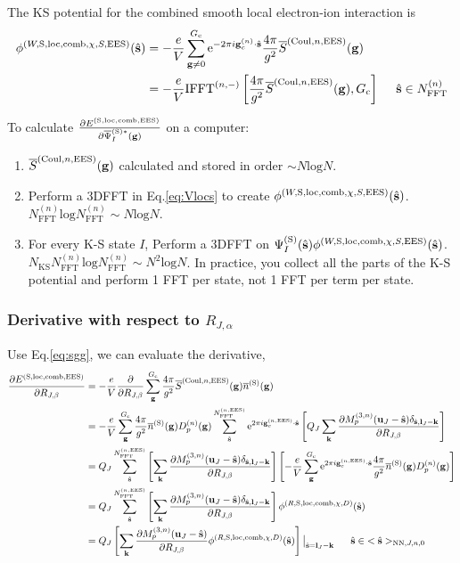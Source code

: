 \documentclass[paper=a4, fontsize=11pt]{article} %
\numberwithin{equation}{section} %
\numberwithin{figure}{section} %
\numberwithin{table}{section} %
\newcommand{\p}{\partial}
\newcommand{\ol}{\overline}
\newcommand{\bu}{{\bf{u}}}
\newcommand{\bl}{{\bf{l}}}
\newcommand{\bk}{{\bf{k}}}
\newcommand{\bs}{{\bf{s}}}
\newcommand{\bg}{{\bf{g}}}
\newcommand{\hs}{{\hat{\bf{s}}}}
\newcommand{\rS}{{\mathrm{S}}}
\newcommand{\rEES}{{\mathrm{EES}}}
\newcommand{\rNN}{{\mathrm{NN}}}
\newcommand{\re}{{\mathrm{e}}}
\newcommand{\rCo}{{\mathrm{Coul}}}
\newcommand{\rcomb}{{\mathrm{comb}}}
\newcommand{\rlo}{{\mathrm{loc}}}
\newcommand{\rl}{{\mathrm{log}}}
\newcommand{\gcn}{{\bg_c^{(n)}}}
\newcommand{\gcnEES}{{\bg_c^{(n,\rEES)}}}
\newcommand{\igcns}{2\pi i\gcn\cdot\hat \bs}
\newcommand{\igcnEESs}{2\pi i\gcnEES\cdot\hat \bs}
\newcommand{\psigsc}{{\overline \Psi_I^{(\rS)*}(\bg)}}
\newcommand{\RJa}{{R_{J,\alpha}}}
\newcommand{\RJb}{{R_{J,\beta}}}
\newcommand{\NKS}{{N_{\mathrm{KS}}}}
\newcommand{\NFFTn}{{N^{(n)}_{\mathrm{FFT}}}}
\newcommand{\NFFTnEES}{{N^{(n,\rEES)}_{\mathrm{FFT}}}}
\newcommand{\Gc}{{G_{\mathrm{c}}}}
\newcommand{\Dng}{{D^{(n)}_p(\bg)}}
\newcommand{\IFFTni}{{\mathrm{IFFT}^{(n,-)}}}
\newcommand{\hsJnzr}{{<\hs>_{\rNN,J,n,0}}}
\newcommand{\hsinJnzr}{{\ \ \ \ \ \hs  \in  \hsJnzr}}
\newcommand{\hsinn}{{\ \ \ \ \hs \in \NFFTn}}
\begin{document}
The KS potential for the combined smooth local electron-ion interaction is
\begin{equation}\label{eq:Vlocs}
\begin{split}
\phi^{(W,\rS,\rlo,\rcomb,\chi,S,\rEES)}(\hs) 
&= -\frac{e}{V} \sum_{\bg \neq 0}^{\Gc} \re^{-\igcns} \frac{4\pi }{g^2} \ol S^{(\rCo,n,\rEES)}(\bg)\\
&= -\frac{e}{V} \IFFTni \left[\frac{4\pi }{g^2} \ol S^{(\rCo,n,\rEES)}(\bg), \Gc \right] \hsinn
\end{split}
\end{equation}

To calculate $\frac{\p E^{(\rS,\rlo,\rcomb,\rEES)}}{ \p \psigsc}$ on a computer:
\begin{enumerate}
\item $\ol S^{(\rCo,n,\rEES)}(\bg)$ calculated and stored in order $\sim N \rl N$.
\item Perform a 3DFFT in Eq.\eqref{eq:Vlocs} to create $\phi^{(W,\rS,\rlo,\rcomb,\chi,S,\rEES)}(\hs)$. $\NFFTn \rl \NFFTn \sim N \rl N$.
\item For every K-S state $I$, Perform a 3DFFT on $\Psi_{I}^{(\rS)}(\hat \bs) \phi^{(W,\rS,\rlo,\rcomb,\chi,S,\rEES)}(\hs)$. $\NKS \NFFTn \rl \NFFTn \sim N^2 \rl N$. In practice, you collect all the parts of the K-S potential and perform 1 FFT per state, not 1 FFT per term per state.
\end{enumerate}




\subsubsection{Derivative with respect to $\RJa$}
Use Eq.\eqref{eq:sgg}, we can evaluate the derivative,
\begin{equation}\label{eq:dElocdR}
\begin{split}
\frac{\p E^{(\rS,\rlo,\rcomb,\rEES)}}{ \p \RJb}
&= -\frac{e}{V} \frac{\p }{ \p \RJb}\sum_{\bg}^\Gc \frac{4\pi}{g^2} \ol S^{(\rCo,n,\rEES)}(\bg)\overline{n}^{(\rS)}(\bg)\\
&= -\frac{e}{V} \sum_{\bg}^\Gc \frac{4\pi}{g^2} \ol{n}^{(\rS)}(\bg) \Dng \sum_{\hat \bs}^\NFFTnEES \re^{2\pi i\gcnEES \cdot \hat\bs} \left[Q_J \sum_{\bk} \frac{\p M_p^{(3,n)}(\bu_{J}-\hat \bs)\delta_{\hat \bs,\bl_J-\bk}}{\p \RJb}\right] \\
&= Q_J \sum_{\hat \bs}^\NFFTnEES \left[ \sum_{\bk} \frac{\p M_p^{(3,n)}(\bu_{J}-\hat \bs)\delta_{\hat \bs,\bl_J-\bk}}{\p \RJb}\right] \left[-\frac{e}{V} \sum_{\bg}^\Gc \re^{\igcnEESs} \frac{4\pi}{g^2} \ol{n}^{(\rS)}(\bg) \Dng \right] \\
&= Q_J \sum_{\hat \bs}^\NFFTnEES \left[ \sum_{\bk} \frac{\p M_p^{(3,n)}(\bu_{J}-\hat \bs)\delta_{\hat \bs,\bl_J-\bk}}{\p \RJb}\right] \phi^{(R,\rS,\rlo,\rcomb,\chi,D)}(\hs)\\
&= Q_J \left[ \sum_{\bk} \frac{\p M_p^{(3,n)}(\bu_{J}-\hat \bs)}{\p \RJb} \phi^{(R,\rS,\rlo,\rcomb,\chi,D)}(\hs)\right]\big|_{\hat \bs=\bl_J-\bk} \hsinJnzr\\    
\end{split}
\end{equation}
\end{document}
